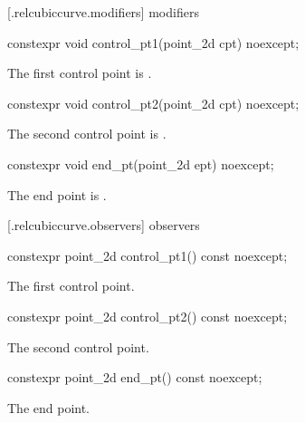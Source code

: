  [\iotwod.relcubiccurve.modifiers]{ modifiers}

%
\begin{itemdecl}
constexpr void control_pt1(point_2d cpt) noexcept;
\end{itemdecl}
\begin{itemdescr}
\pnum
\effects
The first control point is .
\end{itemdescr}

%
\begin{itemdecl}
constexpr void control_pt2(point_2d cpt) noexcept;
\end{itemdecl}
\begin{itemdescr}
\pnum
\effects
The second control point is .
\end{itemdescr}

%
\begin{itemdecl}
constexpr void end_pt(point_2d ept) noexcept;
\end{itemdecl}
\begin{itemdescr}
\pnum
\effects
The end point is .
\end{itemdescr}

 [\iotwod.relcubiccurve.observers]{ observers}

%
\begin{itemdecl}
constexpr point_2d control_pt1() const noexcept;
\end{itemdecl}
\begin{itemdescr}
\pnum
\returns
The first control point.
\end{itemdescr}

%
\begin{itemdecl}
constexpr point_2d control_pt2() const noexcept;
\end{itemdecl}
\begin{itemdescr}
\pnum
\returns
The second control point.
\end{itemdescr}

%
\begin{itemdecl}
constexpr point_2d end_pt() const noexcept;
\end{itemdecl}
\begin{itemdescr}
\pnum
\returns
The end point.
\end{itemdescr}

